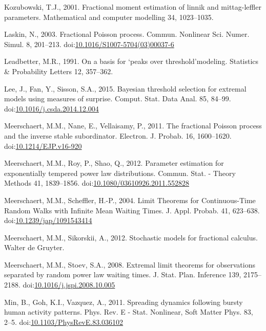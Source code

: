 \documentclass[]{elsarticle} %
\begin{document}
\leavevmode\hypertarget{ref-kozubowski2001}{}%
Kozubowski, T.J., 2001. Fractional moment estimation of linnik and
mittag-leffler parameters. Mathematical and computer modelling 34,
1023--1035.

\leavevmode\hypertarget{ref-Laskin2003}{}%
Laskin, N., 2003. Fractional Poisson process. Commun. Nonlinear Sci.
Numer. Simul. 8, 201--213.
doi:\href{https://doi.org/10.1016/S1007-5704(03)00037-6}{10.1016/S1007-5704(03)00037-6}

\leavevmode\hypertarget{ref-leadbetter1991basis}{}%
Leadbetter, M.R., 1991. On a basis for `peaks over threshold'modeling.
Statistics \& Probability Letters 12, 357--362.

\leavevmode\hypertarget{ref-Lee15}{}%
Lee, J., Fan, Y., Sisson, S.A., 2015. Bayesian threshold selection for
extremal models using measures of surprise. Comput. Stat. Data Anal. 85,
84--99.
doi:\href{https://doi.org/10.1016/j.csda.2014.12.004}{10.1016/j.csda.2014.12.004}

\leavevmode\hypertarget{ref-Meerschaert2010b}{}%
Meerschaert, M.M., Nane, E., Vellaisamy, P., 2011. The fractional
Poisson process and the inverse stable subordinator. Electron. J.
Probab. 16, 1600--1620.
doi:\href{https://doi.org/10.1214/EJP.v16-920}{10.1214/EJP.v16-920}

\leavevmode\hypertarget{ref-MeerschaertRoyQin}{}%
Meerschaert, M.M., Roy, P., Shao, Q., 2012. Parameter estimation for
exponentially tempered power law distributions. Commun. Stat. - Theory
Methods 41, 1839--1856.
doi:\href{https://doi.org/10.1080/03610926.2011.552828}{10.1080/03610926.2011.552828}

\leavevmode\hypertarget{ref-limitCTRW}{}%
Meerschaert, M.M., Scheffler, H.-P., 2004. Limit Theorems for
Continuous-Time Random Walks with Infinite Mean Waiting Times. J. Appl.
Probab. 41, 623--638.
doi:\href{https://doi.org/10.1239/jap/1091543414}{10.1239/jap/1091543414}

\leavevmode\hypertarget{ref-MeerschaertSikorskii}{}%
Meerschaert, M.M., Sikorskii, A., 2012. Stochastic models for fractional
calculus. Walter de Gruyter.

\leavevmode\hypertarget{ref-MeerschaertStoev08}{}%
Meerschaert, M.M., Stoev, S.A., 2008. Extremal limit theorems for
observations separated by random power law waiting times. J. Stat. Plan.
Inference 139, 2175--2188.
doi:\href{https://doi.org/10.1016/j.jspi.2008.10.005}{10.1016/j.jspi.2008.10.005}

\leavevmode\hypertarget{ref-Min2010}{}%
Min, B., Goh, K.I., Vazquez, A., 2011. Spreading dynamics following
bursty human activity patterns. Phys. Rev. E - Stat. Nonlinear, Soft
Matter Phys. 83, 2--5.
doi:\href{https://doi.org/10.1103/PhysRevE.83.036102}{10.1103/PhysRevE.83.036102}
\end{document}

